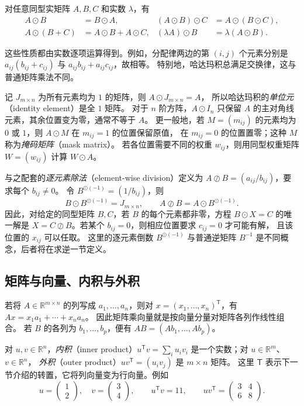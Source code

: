 \documentclass[UTF8,12pt,a4paper,fontset=fandol]{ctexart}
\begin{document}
\begin{property}[哈达玛积的运算律]
对任意同型实矩阵 $A,B,C$ 和实数 $\lambda$，有
\begin{align*}
  A\odot B&=B\odot A,&
  (A\odot B)\odot C&=A\odot(B\odot C),\\
  A\odot(B+C)&=A\odot B+A\odot C,&
  (\lambda A)\odot B&=\lambda(A\odot B).
\end{align*}
\end{property}

这些性质都由实数逐项运算得到。例如，分配律两边的第 $(i,j)$ 个元素分别是
$a_{ij}(b_{ij}+c_{ij})$ 与 $a_{ij}b_{ij}+a_{ij}c_{ij}$，故相等。
特别地，哈达玛积总满足交换律，这与普通矩阵乘法不同。

记 $J_{m\times n}$ 为所有元素均为 $1$ 的矩阵，则 $A\odot J_{m\times n}=A$，
所以哈达玛积的\emph{单位元}（identity element）是全 $1$ 矩阵。
对于 $n$ 阶方阵，$A\odot I_n$ 只保留 $A$ 的主对角线元素，其余位置变为零，通常不等于 $A$。
更一般地，若 $M=(m_{ij})$ 的元素均为 $0$ 或 $1$，则 $A\odot M$ 在 $m_{ij}=1$ 的位置保留原值，
在 $m_{ij}=0$ 的位置置零；这种 $M$ 称为\emph{掩码矩阵}（mask matrix）。
若各位置需要不同的权重 $w_{ij}$，则用同型权重矩阵 $W=(w_{ij})$ 计算 $W\odot A$。

与之配套的\emph{逐元素除法}（element-wise division）定义为
$A\oslash B=(a_{ij}/b_{ij})$，要求每个 $b_{ij}\ne0$。
令 $B^{\odot(-1)}=(1/b_{ij})$，则
\[
  B\odot B^{\odot(-1)}=J_{m\times n},\qquad
  A\oslash B=A\odot B^{\odot(-1)}.
\]
因此，对给定的同型矩阵 $B,C$，若 $B$ 的每个元素都非零，方程 $B\odot X=C$ 的唯一解是
$X=C\oslash B$。若某个 $b_{ij}=0$，则相应位置要求 $c_{ij}=0$ 才可能有解，
且该位置的 $x_{ij}$ 可以任取。
这里的逐元素倒数 $B^{\odot(-1)}$ 与普通逆矩阵 $B^{-1}$ 是不同概念，后者将在求逆一节定义。

\subsection{矩阵与向量、内积与外积}

若将 $A\in\mathbb R^{m\times n}$ 的列写成 $a_1,\ldots,a_n$，则对
$x=(x_1,\ldots,x_n)^{\mathsf T}$，有 $Ax=x_1a_1+\cdots+x_na_n$。
因此矩阵乘向量就是按向量分量对矩阵各列作线性组合。
若 $B$ 的各列为 $b_1,\ldots,b_p$，便有 $AB=(Ab_1,\ldots,Ab_p)$。

对 $u,v\in\mathbb R^n$，\emph{内积}（inner product）$u^{\mathsf T}v=\sum_i u_iv_i$
是一个实数；对 $u\in\mathbb R^m$、$v\in\mathbb R^n$，
\emph{外积}（outer product）$uv^{\mathsf T}=(u_iv_j)$ 是 $m\times n$ 矩阵。
这里 $\mathsf T$ 表示下一节介绍的转置，它将列向量变为行向量。例如
\[
  u=\begin{pmatrix}1\\2\end{pmatrix},\quad
  v=\begin{pmatrix}3\\4\end{pmatrix},\qquad
  u^{\mathsf T}v=11,\qquad uv^{\mathsf T}=\begin{pmatrix}3&4\\6&8\end{pmatrix}.
\]
\end{document}
